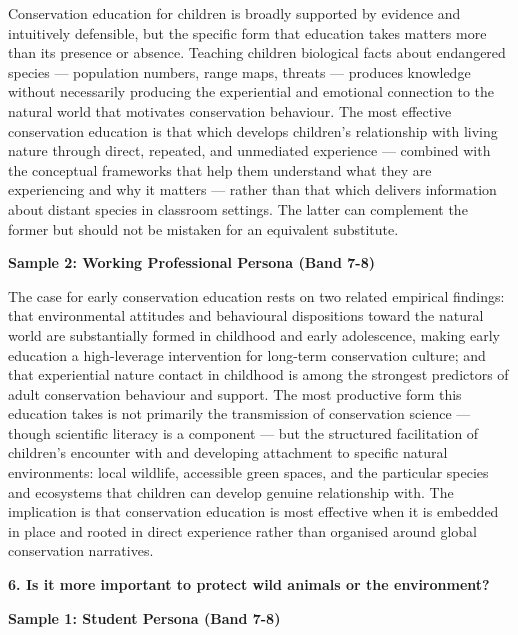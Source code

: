 Conservation education for children is broadly supported by evidence and intuitively defensible, but the specific form that education takes matters more than its presence or absence. Teaching children biological facts about endangered species — population numbers, range maps, threats — produces knowledge without necessarily producing the experiential and emotional connection to the natural world that motivates conservation behaviour. The most effective conservation education is that which develops children's relationship with living nature through direct, repeated, and unmediated experience — combined with the conceptual frameworks that help them understand what they are experiencing and why it matters — rather than that which delivers information about distant species in classroom settings. The latter can complement the former but should not be mistaken for an equivalent substitute.

\textbf{Sample 2: Working Professional Persona (Band 7-8)}

The case for early conservation education rests on two related empirical findings: that environmental attitudes and behavioural dispositions toward the natural world are substantially formed in childhood and early adolescence, making early education a high-leverage intervention for long-term conservation culture; and that experiential nature contact in childhood is among the strongest predictors of adult conservation behaviour and support. The most productive form this education takes is not primarily the transmission of conservation science — though scientific literacy is a component — but the structured facilitation of children's encounter with and developing attachment to specific natural environments: local wildlife, accessible green spaces, and the particular species and ecosystems that children can develop genuine relationship with. The implication is that conservation education is most effective when it is embedded in place and rooted in direct experience rather than organised around global conservation narratives.

\separator

\begin{ieltsquestion}
\textbf{6. Is it more important to protect wild animals or the environment?}
\end{ieltsquestion}
\textbf{Sample 1: Student Persona (Band 7-8)}

